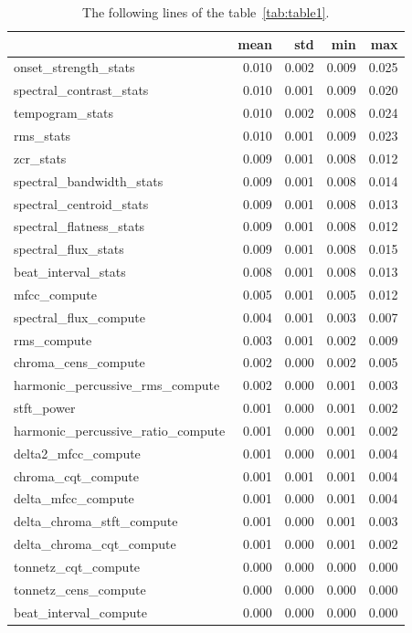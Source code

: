 \documentclass[11pt]{article}
\begin{document}
\begin{table}
  \centering
  \caption{The following lines of the table~\ref{tab:table1}.}
  \label{tab:table2}
  \begin{tabular}{lrrrr}
    \toprule
    & mean & std & min & max \\
    \midrule
onset\_strength\_stats & 0.010 & 0.002 & 0.009 & 0.025 \\
spectral\_contrast\_stats & 0.010 & 0.001 & 0.009 & 0.020 \\
tempogram\_stats & 0.010 & 0.002 & 0.008 & 0.024 \\
rms\_stats & 0.010 & 0.001 & 0.009 & 0.023 \\
zcr\_stats & 0.009 & 0.001 & 0.008 & 0.012 \\
spectral\_bandwidth\_stats & 0.009 & 0.001 & 0.008 & 0.014 \\
spectral\_centroid\_stats & 0.009 & 0.001 & 0.008 & 0.013 \\
spectral\_flatness\_stats & 0.009 & 0.001 & 0.008 & 0.012 \\
spectral\_flux\_stats & 0.009 & 0.001 & 0.008 & 0.015 \\
beat\_interval\_stats & 0.008 & 0.001 & 0.008 & 0.013 \\
mfcc\_compute & 0.005 & 0.001 & 0.005 & 0.012 \\
spectral\_flux\_compute & 0.004 & 0.001 & 0.003 & 0.007 \\
rms\_compute & 0.003 & 0.001 & 0.002 & 0.009 \\
chroma\_cens\_compute & 0.002 & 0.000 & 0.002 & 0.005 \\
harmonic\_percussive\_rms\_compute & 0.002 & 0.000 & 0.001 & 0.003 \\
stft\_power & 0.001 & 0.000 & 0.001 & 0.002 \\
harmonic\_percussive\_ratio\_compute & 0.001 & 0.000 & 0.001 & 0.002 \\
delta2\_mfcc\_compute & 0.001 & 0.000 & 0.001 & 0.004 \\
chroma\_cqt\_compute & 0.001 & 0.001 & 0.001 & 0.004 \\
delta\_mfcc\_compute & 0.001 & 0.000 & 0.001 & 0.004 \\
delta\_chroma\_stft\_compute & 0.001 & 0.000 & 0.001 & 0.003 \\
delta\_chroma\_cqt\_compute & 0.001 & 0.000 & 0.001 & 0.002 \\
tonnetz\_cqt\_compute & 0.000 & 0.000 & 0.000 & 0.000 \\
tonnetz\_cens\_compute & 0.000 & 0.000 & 0.000 & 0.000 \\
beat\_interval\_compute & 0.000 & 0.000 & 0.000 & 0.000 \\
\bottomrule
  \end{tabular}
\end{table}
\end{document}
